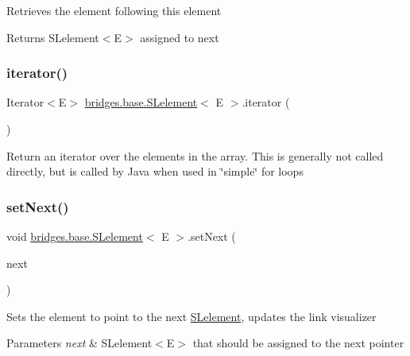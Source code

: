 Retrieves the element following this element

\begin{DoxyReturn}{Returns}
S\+Lelement$<$\+E$>$ assigned to next 
\end{DoxyReturn}
\mbox{\label{classbridges_1_1base_1_1_s_lelement_ab93c03af9d847d32e126d102c18aad9d}} 
\subsubsection{\texorpdfstring{iterator()}{iterator()}}
{\footnotesize\ttfamily Iterator$<$E$>$ \hyperlink{classbridges_1_1base_1_1_s_lelement}{bridges.\+base.\+S\+Lelement}$<$ E $>$.iterator (\begin{DoxyParamCaption}{ }\end{DoxyParamCaption})}

Return an iterator over the elements in the array. This is generally not called directly, but is called by Java when used in \char`\"{}simple\char`\"{} for loops \mbox{\label{classbridges_1_1base_1_1_s_lelement_afdd42f03071b2614822b73729e1a5a1a}} 
\subsubsection{\texorpdfstring{set\+Next()}{setNext()}}
{\footnotesize\ttfamily void \hyperlink{classbridges_1_1base_1_1_s_lelement}{bridges.\+base.\+S\+Lelement}$<$ E $>$.set\+Next (\begin{DoxyParamCaption}\item[{\hyperlink{classbridges_1_1base_1_1_s_lelement}{S\+Lelement}$<$ E $>$}]{next }\end{DoxyParamCaption})}

Sets the element to point to the next \hyperlink{classbridges_1_1base_1_1_s_lelement}{S\+Lelement}, updates the link visualizer


\begin{DoxyParams}{Parameters}
{\em next} & S\+Lelement$<$\+E$>$ that should be assigned to the next pointer \\
\hline
\end{DoxyParams}
\mbox{\label{classbridges_1_1base_1_1_s_lelement_af0ec4da5b29d0f5ab6ab38e91cca51f9}} 
